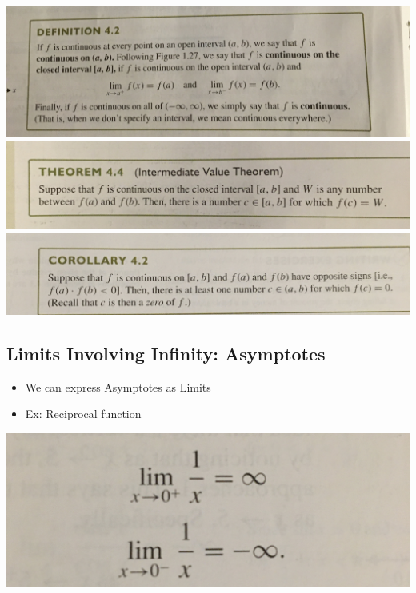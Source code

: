 \documentclass{article}
\begin{document}
    \includegraphics[width=\linewidth]{Pre-Reading/Chapter 1/IMG_0969.JPG}
    \includegraphics[width=\linewidth]{Pre-Reading/Chapter 1/IMG_0970.JPG}
    \includegraphics[width=\linewidth]{Pre-Reading/Chapter 1/IMG_0971.JPG}

    \subsection{Limits Involving Infinity: Asymptotes}
    \begin{itemize}
        \item We can express Asymptotes as Limits
        \item Ex: Reciprocal function
    \end{itemize}
    \begin{center}
        \includegraphics[scale=0.1]{Pre-Reading/Chapter 1/IMG_0972.JPG} 
    \end{center}
\end{document}
